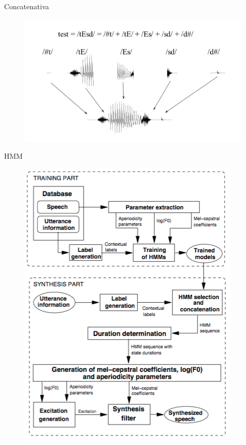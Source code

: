 \documentclass{beamer}
\begin{document}
\begin{frame}{Concatenativa}
    \begin{figure}
      \includegraphics[scale=0.60]{concatenative.png}
    \end{figure}
\end{frame}

\begin{frame}{HMM}
    \begin{figure}
      \includegraphics[scale=0.38]{hmm.png}
    \end{figure}
\end{frame}
\end{document}
